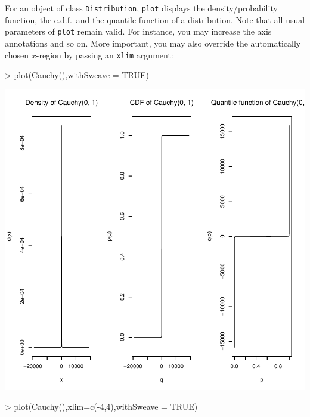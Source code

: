 \documentclass[11pt]{article}
\newcommand{\code}[1]{{\tt #1}}
\begin{document}
For an object of class \code{Distribution},
\code{plot} displays the density/probability function, the c.d.f.\ and the
quantile function of a distribution. Note that all usual parameters of
\code{plot} remain valid. For instance, you may increase the axis annotations
and so on. More important, you may also
override the automatically chosen $x$-region by passing an \code{xlim} argument:
\begin{Schunk}
\begin{Sinput}
>   plot(Cauchy(),withSweave = TRUE)
\end{Sinput}
\end{Schunk}
\includegraphics{distr-cauchy1}
\begin{Schunk}
\begin{Sinput}
>   plot(Cauchy(),xlim=c(-4,4),withSweave = TRUE)
\end{Sinput}
\end{Schunk}
\end{document}
